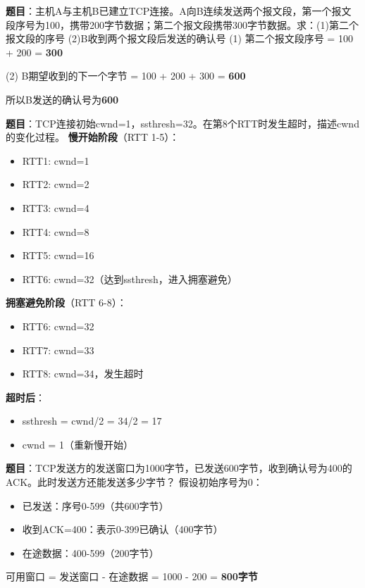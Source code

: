 \begin{examplebox}
\textbf{题目}：主机A与主机B已建立TCP连接。A向B连续发送两个报文段，第一个报文段序号为100，携带200字节数据；第二个报文段携带300字节数据。求：(1)第二个报文段的序号 (2)B收到两个报文段后发送的确认号
\tcblower
(1) 第二个报文段序号 = 100 + 200 = \textbf{300}

(2) B期望收到的下一个字节 = 100 + 200 + 300 = \textbf{600}

所以B发送的确认号为\textbf{600}
\end{examplebox}

\begin{examplebox}
\textbf{题目}：TCP连接初始cwnd=1，ssthresh=32。在第8个RTT时发生超时，描述cwnd的变化过程。
\tcblower
\textbf{慢开始阶段}（RTT 1-5）：
\begin{itemize}[itemsep=0pt]
    \item RTT1: cwnd=1
    \item RTT2: cwnd=2
    \item RTT3: cwnd=4
    \item RTT4: cwnd=8
    \item RTT5: cwnd=16
    \item RTT6: cwnd=32（达到ssthresh，进入拥塞避免）
\end{itemize}

\textbf{拥塞避免阶段}（RTT 6-8）：
\begin{itemize}[itemsep=0pt]
    \item RTT6: cwnd=32
    \item RTT7: cwnd=33
    \item RTT8: cwnd=34，发生超时
\end{itemize}

\textbf{超时后}：
\begin{itemize}[itemsep=0pt]
    \item ssthresh = cwnd/2 = 34/2 = 17
    \item cwnd = 1（重新慢开始）
\end{itemize}
\end{examplebox}

\begin{examplebox}
\textbf{题目}：TCP发送方的发送窗口为1000字节，已发送600字节，收到确认号为400的ACK。此时发送方还能发送多少字节？
\tcblower
假设初始序号为0：
\begin{itemize}[itemsep=0pt]
    \item 已发送：序号0-599（共600字节）
    \item 收到ACK=400：表示0-399已确认（400字节）
    \item 在途数据：400-599（200字节）
\end{itemize}

可用窗口 = 发送窗口 - 在途数据 = 1000 - 200 = \textbf{800字节}
\end{examplebox}

